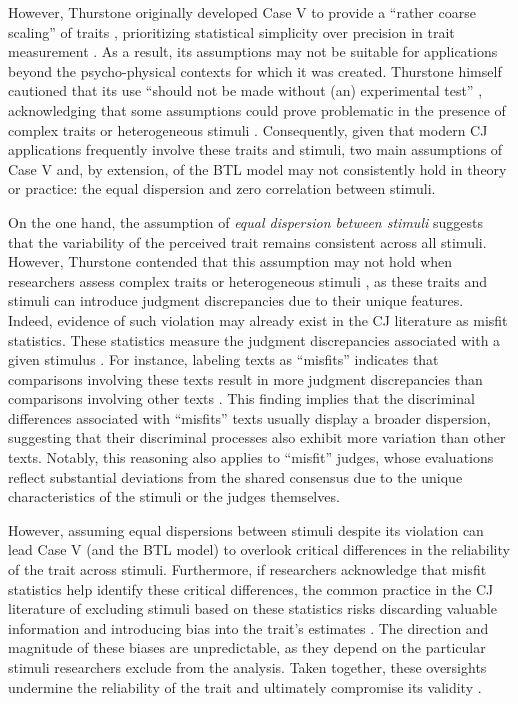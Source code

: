 \documentclass[
  authoryear,
  preprint,
  1p]{elsarticle}
\begin{document}
However, Thurstone originally developed Case V to provide a ``rather
coarse scaling'' of traits \citep[pp.~269]{Thurstone_1927b},
prioritizing statistical simplicity over precision in trait measurement
\citep[pp.~677]{Kelly_et_al_2022}. As a result, its assumptions may not
be suitable for applications beyond the psycho-physical contexts for
which it was created. Thurstone himself cautioned that its use ``should
not be made without (an) experimental test''
\citep[pp.~270]{Thurstone_1927b}, acknowledging that some assumptions
could prove problematic in the presence of complex traits or
heterogeneous stimuli \citep[pp.~376]{Thurstone_1927a}. Consequently,
given that modern CJ applications frequently involve these traits and
stimuli, two main assumptions of Case V and, by extension, of the BTL
model may not consistently hold in theory or practice: the equal
dispersion and zero correlation between stimuli.

On the one hand, the assumption of \emph{equal dispersion between
stimuli} suggests that the variability of the perceived trait remains
consistent across all stimuli. However, Thurstone contended that this
assumption may not hold when researchers assess complex traits or
heterogeneous stimuli \citep[pp.~376]{Thurstone_1927a}, as these traits
and stimuli can introduce judgment discrepancies due to their unique
features. Indeed, evidence of such violation may already exist in the CJ
literature as misfit statistics. These statistics measure the judgment
discrepancies associated with a given stimulus
\citetext{\citealp[pp.~12]{Pollitt_2004}; \citealp[pp.~20]{Goossens_et_al_2018}}.
For instance, labeling texts as ``misfits'' indicates that comparisons
involving these texts result in more judgment discrepancies than
comparisons involving other texts
\citep{Pollitt_2012a, Pollitt_2012b, vanDaal_et_al_2016, Goossens_et_al_2018}.
This finding implies that the discriminal differences associated with
``misfits'' texts usually display a broader dispersion, suggesting that
their discriminal processes also exhibit more variation than other
texts. Notably, this reasoning also applies to ``misfit'' judges, whose
evaluations reflect substantial deviations from the shared consensus due
to the unique characteristics of the stimuli or the judges themselves.

However, assuming equal dispersions between stimuli despite its
violation can lead Case V (and the BTL model) to overlook critical
differences in the reliability of the trait across stimuli. Furthermore,
if researchers acknowledge that misfit statistics help identify these
critical differences, the common practice in the CJ literature of
excluding stimuli based on these statistics
\citep{Pollitt_2012b, vanDaal_et_al_2017, Goossens_et_al_2018} risks
discarding valuable information and introducing bias into the trait's
estimates \citep[chap.~12]{Zimmerman_1994, McElreath_2020}. The
direction and magnitude of these biases are unpredictable, as they
depend on the particular stimuli researchers exclude from the analysis.
Taken together, these oversights undermine the reliability of the trait
and ultimately compromise its validity \citep[pp.~2]{Perron_et_al_2015}.
\end{document}
